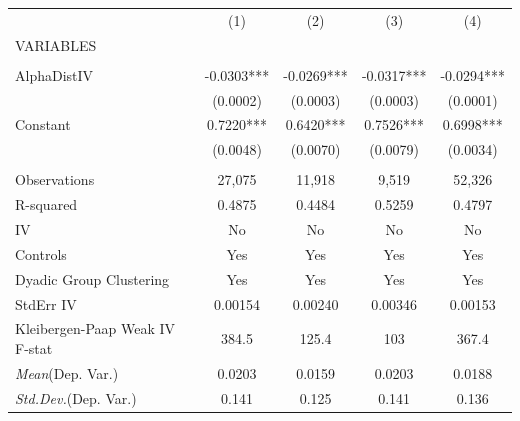 \documentclass[]{article}
\begin{document}
\begin{tabular}{lcccc} \hline
 & (1) & (2) & (3) & (4) \\
VARIABLES &  &  &  &  \\ \hline
 &  &  &  &  \\
AlphaDistIV & -0.0303*** & -0.0269*** & -0.0317*** & -0.0294*** \\
 & (0.0002) & (0.0003) & (0.0003) & (0.0001) \\
Constant & 0.7220*** & 0.6420*** & 0.7526*** & 0.6998*** \\
 & (0.0048) & (0.0070) & (0.0079) & (0.0034) \\
 &  &  &  &  \\
Observations & 27,075 & 11,918 & 9,519 & 52,326 \\
R-squared & 0.4875 & 0.4484 & 0.5259 & 0.4797 \\
IV & No & No & No & No \\
Controls & Yes & Yes & Yes & Yes \\
Dyadic Group Clustering & Yes & Yes & Yes & Yes \\
StdErr IV & 0.00154 & 0.00240 & 0.00346 & 0.00153 \\
Kleibergen-Paap Weak IV F-stat & 384.5 & 125.4 & 103 & 367.4 \\
\textit{Mean}(Dep. Var.) & 0.0203 & 0.0159 & 0.0203 & 0.0188 \\
 \textit{Std.Dev.}(Dep. Var.) & 0.141 & 0.125 & 0.141 & 0.136 \\ \hline
\end{tabular}
\end{document}
